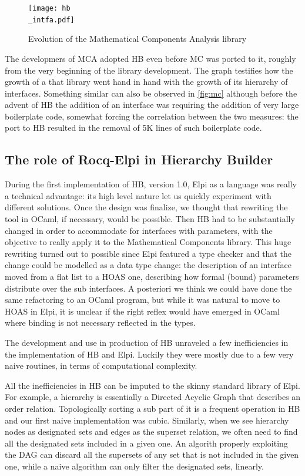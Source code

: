 \documentclass[a4paper, 11pt]{book}
\begin{document}
\begin{figure}[!hb]
\texttt{[image: hb\\\_intfa.pdf]}
\caption{Evolution of the Mathematical Components Analysis library\label{fig:mca}}
\end{figure}

The developmers of MCA adopted HB even before MC was ported to it, roughly from
the very beginning of the library development. The graph testifies how
the growth of a that library went hand in hand with the growth of
its hierarchy of interfaces. Something similar can also be observed in
\ref{fig:mc} although before the advent of HB the addition of an interface
was requiring the addition of very large boilerplate code, somewhat forcing
the correlation between the two measures: the port to HB resulted in the
removal of 5K lines of such boilerplate code.

\subsection{The role of Rocq-Elpi in Hierarchy Builder}

During the first implementation of HB, version 1.0, Elpi as a language was
really a technical advantage: its high level nature let us quickly experiment
with different solutions. Once the design was finalize, we thought that rewriting
the tool in OCaml, if necessary, would be possible. Then HB had to be substantially
changed in order to accommodate for interfaces with parameters, with the objective
to really apply it to the Mathematical Components library. This huge rewriting
turned out to possible since Elpi featured a type checker and that the change
could be modelled as a data type change: the description of an interface moved from
a flat list to a HOAS one, describing how formal (bound) parameters distribute over
the sub interfaces. A posteriori we think we could have done the same
refactoring to an OCaml program, but while it was natural to move to HOAS
in Elpi, it is unclear if the right reflex would have emerged in OCaml where
binding is not necessary reflected in the types.

The development and use in production of HB unraveled a few inefficiencies
in the implementation of HB and Elpi. Luckily they were mostly due to
a few very naive routines, in terms of computational complexity.

All the inefficiencies in HB can be imputed to the skinny standard library
of Elpi. For example, a hierarchy is essentially a Directed Acyclic Graph that
describes an order relation. Topologically sorting a sub part of it is a
frequent operation in HB and our first naive implementation was cubic.
Similarly, when we see hierarchy nodes as designated sets and
edges as the superset relation, we often need to find all the designated
sets included in a given one. An algorith properly exploiting the DAG
can discard all the supersets of any set that is not included in the given one,
while a naive algorithm can only filter the designated sets, linearly.
\end{document}
